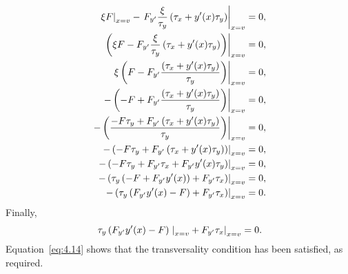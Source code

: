 \begin{equation*}
\begin{split}
\left. \xi F \right|_{x=v} - \left. F_{y^\prime} \frac{\xi}{\tau_y}\left(\tau_x +y^\prime(x)\tau_y\right)\right|_{x=v} &= 0,\\
\left. \left(\xi F -  F_{y^\prime} \frac{\xi}{\tau_y}\left(\tau_x +y^\prime(x)\tau_y\right)\right)\right|_{x=v} &= 0,\\
\left. \xi\left(F -  F_{y^\prime} \frac{\left(\tau_x +y^\prime(x)\tau_y\right)}{\tau_y}\right)\right|_{x=v} &= 0,\\
\left. -\left(-F +  F_{y^\prime} \frac{\left(\tau_x +y^\prime(x)\tau_y\right)}{\tau_y}\right)\right|_{x=v} &= 0,\\
\left. -\left(\frac{-F\tau_y +  F_{y^\prime} \left(\tau_x +y^\prime(x)\tau_y\right)}{\tau_y}\right)\right|_{x=v} &= 0,\\
\left. -\left(-F\tau_y +  F_{y^\prime} \left(\tau_x +y^\prime(x)\tau_y\right)\right)\right|_{x=v} &= 0,\\
\left. -\left(-F\tau_y +  F_{y^\prime} \tau_x + F_{y^\prime} y^\prime(x)\tau_y\right)\right|_{x=v} &= 0,\\
\left. -\left(\tau_y \left(-F+F_{y^\prime} y^\prime(x)\right) + F_{y^\prime} \tau_x \right)\right|_{x=v} &= 0,\\
\left. -\left(\tau_y \left(F_{y^\prime} y^\prime(x) - F\right) + F_{y^\prime} \tau_x \right)\right|_{x=v} &= 0.
\end{split}
\end{equation*}
Finally,
\begin{equation}
\label{eq:4.14}
\left. \tau_y \left(F_{y^\prime} y^\prime(x) - F\right)\left.\right|_{x=v} + F_{y^\prime} \tau_x\right|_{x=v} = 0.
\end{equation}
Equation~\eqref{eq:4.14} shows that the transversality condition has been satisfied, as required.

